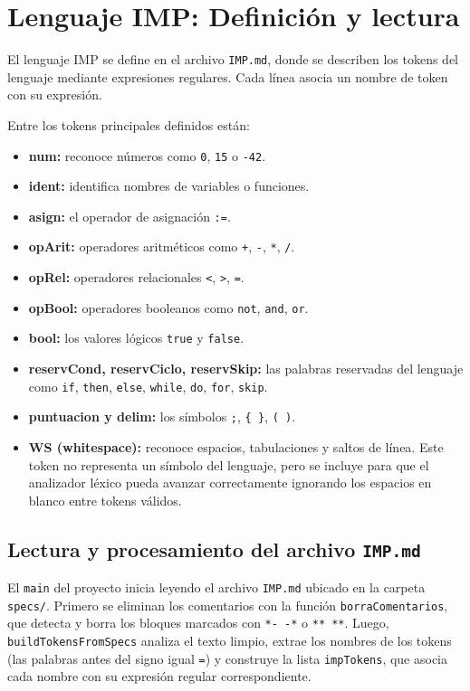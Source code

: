 \section{Lenguaje IMP: Definición y lectura}

El lenguaje IMP se define en el archivo \texttt{IMP.md}, donde se describen los tokens del lenguaje mediante expresiones regulares.  
Cada línea asocia un nombre de token con su expresión.

Entre los tokens principales definidos están:
\begin{itemize}
  \item \textbf{num:} reconoce números como \texttt{0}, \texttt{15} o \texttt{-42}.
  \item \textbf{ident:} identifica nombres de variables o funciones.
  \item \textbf{asign:} el operador de asignación \texttt{:=}.
  \item \textbf{opArit:} operadores aritméticos como \texttt{+}, \texttt{-}, \texttt{*}, \texttt{/}.
  \item \textbf{opRel:} operadores relacionales \texttt{<}, \texttt{>}, \texttt{=}.
  \item \textbf{opBool:} operadores booleanos como \texttt{not}, \texttt{and}, \texttt{or}.
  \item \textbf{bool:} los valores lógicos \texttt{true} y \texttt{false}.
  \item \textbf{reservCond, reservCiclo, reservSkip:} las palabras reservadas del lenguaje como \texttt{if}, \texttt{then}, \texttt{else}, \texttt{while}, \texttt{do}, \texttt{for}, \texttt{skip}.
  \item \textbf{puntuacion y delim:} los símbolos \texttt{;}, \texttt{\{ \}}, \texttt{( )}.
  \item \textbf{WS (whitespace):} reconoce espacios, tabulaciones y saltos de línea.  
  Este token no representa un símbolo del lenguaje, pero se incluye para que el analizador léxico pueda avanzar correctamente ignorando los espacios en blanco entre tokens válidos.
\end{itemize}

\subsection*{Lectura y procesamiento del archivo \texttt{IMP.md}}
El \texttt{main} del proyecto inicia leyendo el archivo \texttt{IMP.md} ubicado en la carpeta \texttt{specs/}.  
Primero se eliminan los comentarios con la función \texttt{borraComentarios}, que detecta y borra los bloques marcados con \texttt{*- -*} o \texttt{** **}.  
Luego, \texttt{buildTokensFromSpecs} analiza el texto limpio, extrae los nombres de los tokens (las palabras antes del signo igual \texttt{=}) y construye la lista \texttt{impTokens}, que asocia cada nombre con su expresión regular correspondiente.

